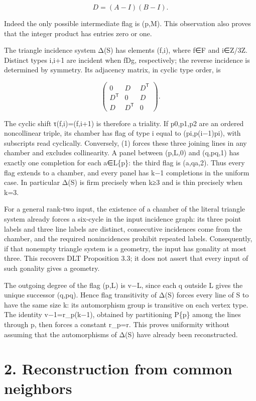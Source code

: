 \documentclass[
  11pt,
  a4paper,
]{article}
\newcounter{none} %
\begin{document}
\[
 D=(A-I)(B-I).
\tag{2}
\]

Indeed the only possible intermediate flag is (p,M). This observation
also proves that the integer product has entries zero or one.

The triangle incidence system Δ(S) has elements (f,i), where f∈F and
i∈Z/3Z. Distinct types i,i+1 are incident when fDg, respectively; the
reverse incidence is determined by symmetry. Its adjacency matrix, in
cyclic type order, is

\[
 \begin{pmatrix}0&D&D^{\mathsf T}\\D^{\mathsf T}&0&D\\
 D&D^{\mathsf T}&0\end{pmatrix}.
\tag{3}
\]

The cyclic shift τ(f,i)=(f,i+1) is therefore a triality. If p0,p1,p2 are
an ordered noncollinear triple, its chamber has flag of type i equal to
(pi,p(i−1)pi), with subscripts read cyclically. Conversely, (1) forces
these three joining lines in any chamber and excludes collinearity. A
panel between (p,L,0) and (q,pq,1) has exactly one completion for each
a∈L\{p\}: the third flag is (a,qa,2). Thus every flag extends to a
chamber, and every panel has k−1 completions in the uniform case. In
particular Δ(S) is firm precisely when k≥3 and is thin precisely when
k=3.

For a general rank-two input, the existence of a chamber of the literal
triangle system already forces a six-cycle in the input incidence graph:
its three point labels and three line labels are distinct, consecutive
incidences come from the chamber, and the required nonincidences
prohibit repeated labels. Consequently, if that nonempty triangle system
is a geometry, the input has gonality at most three. This recovers DLT
Proposition 3.3; it does not assert that every input of such gonality
gives a geometry.

The outgoing degree of the flag (p,L) is v−\textbar L\textbar, since
each q outside L gives the unique successor (q,pq). Hence flag
transitivity of Δ(S) forces every line of S to have the same size k: its
automorphism group is transitive on each vertex type. The identity
v−1=r\_p(k−1), obtained by partitioning P\{p\} among the lines through
p, then forces a constant r\_p=r. This proves uniformity without
assuming that the automorphisms of Δ(S) have already been reconstructed.

\section{2. Reconstruction from common
neighbors}\label{reconstruction-from-common-neighbors}
\end{document}
